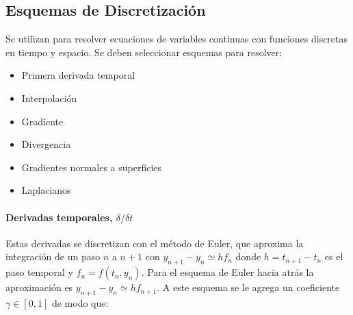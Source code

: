 %
%
%


\subsection{Esquemas de Discretización}

Se utilizan para resolver ecuaciones de variables continuas con funciones
discretas en tiempo y espacio.
%
Se deben seleccionar esquemas para resolver:

\begin{itemize}
  \item Primera derivada temporal
  \item Interpolación
  \item Gradiente
  \item Divergencia
  \item Gradientes normales a superficies
  \item Laplacianos
\end{itemize}


\paragraph{Derivadas temporales, $\delta / \delta t$}
%
Estas derivadas se discretizan con el método de Euler\parencite{burden}, que
aproxima la integración de un paso $n$ a $n+1$ con $y_{n+1}-y_{n}\simeq hf_{n}$
donde $h = t_{n+1}-t_{n}$ es el paso temporal y $f_{n}=f(t_{n},y_{n})$.
%
Para el esquema de Euler hacia atrás la aproximación es
$y_{n+1}-y_{n}\simeq h f_{n+1}$.
%
A este esquema se le agrega un coeficiente $\gamma\in[0,1]$ de modo que:

